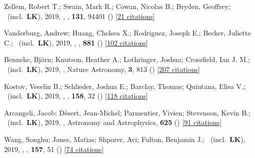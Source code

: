 \item[{\color{numcolor}\scriptsize31}] Zellem, Robert T.; Swain, Mark R.; Cowan, Nicolas B.; Bryden, Geoffrey; \etal\ (incl.\ \textbf{LK}), 2019, , \pasp, \textbf{131}, 94401 () [\href{https://ui.adsabs.harvard.edu/abs/2019PASP..131i4401Z}{21 citations}]

\item[{\color{numcolor}\scriptsize30}] Vanderburg, Andrew; Huang, Chelsea X.; Rodriguez, Joseph E.; Becker, Juliette C.; \etal\ (incl.\ \textbf{LK}), 2019, , \apj, \textbf{881} () [\href{https://ui.adsabs.harvard.edu/abs/2019ApJ...881L..19V}{102 citations}]

\item[{\color{numcolor}\scriptsize29}] Benneke, Bj{\"o}rn; Knutson, Heather A.; Lothringer, Joshua; Crossfield, Ian J. M.; \etal\ (incl.\ \textbf{LK}), 2019, , Nature Astronomy, \textbf{3}, 813 () [\href{https://ui.adsabs.harvard.edu/abs/2019NatAs...3..813B}{207 citations}]

\item[{\color{numcolor}\scriptsize28}] Kostov, Veselin B.; Schlieder, Joshua E.; Barclay, Thomas; Quintana, Elisa V.; \etal\ (incl.\ \textbf{LK}), 2019, , \aj, \textbf{158}, 32 () [\href{https://ui.adsabs.harvard.edu/abs/2019AJ....158...32K}{118 citations}]

\item[{\color{numcolor}\scriptsize27}] Arcangeli, Jacob; D{\'e}sert, Jean-Michel; Parmentier, Vivien; Stevenson, Kevin B.; \etal\ (incl.\ \textbf{LK}), 2019, , Astronomy and Astrophysics, \textbf{625} () [\href{https://ui.adsabs.harvard.edu/abs/2019A&A...625A.136A}{91 citations}]

\item[{\color{numcolor}\scriptsize26}] Wang, Songhu; Jones, Matias; Shporer, Avi; Fulton, Benjamin J.; \etal\ (incl.\ \textbf{LK}), 2019, , \aj, \textbf{157}, 51 () [\href{https://ui.adsabs.harvard.edu/abs/2019AJ....157...51W}{74 citations}]

